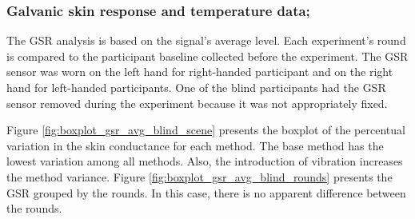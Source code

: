 \subsubsection{Galvanic skin response and temperature data;}
\label{subsubsec:results_gsr_temp_1}

The GSR analysis is based on the signal's average level. Each experiment's round is compared to the participant baseline collected before the experiment. The GSR sensor was worn on the left hand for right-handed participant and on the right hand for left-handed participants. One of the blind participants had the GSR sensor removed during the experiment because it was not appropriately fixed.


%


%


Figure \ref{fig:boxplot_gsr_avg_blind_scene} presents the boxplot of the percentual variation in the skin conductance for each method. The base method has the lowest variation among all methods. Also, the introduction of vibration increases the method variance. Figure \ref{fig:boxplot_gsr_avg_blind_rounds} presents the GSR grouped by the rounds. In this case, there is no apparent difference between the rounds.

